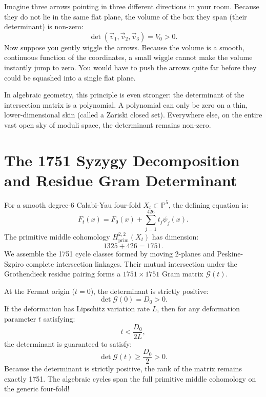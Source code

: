\documentclass[11pt,a4paper]{article}
\theoremstyle{definition}
\begin{document}
Imagine three arrows pointing in three different directions in your room. Because they do not lie in the same flat plane, the volume of the box they span (their determinant) is non-zero:
\begin{equation}
\det(\vec{v}_1, \vec{v}_2, \vec{v}_3) = V_0 > 0.
\end{equation}
Now suppose you gently wiggle the arrows. Because the volume is a smooth, continuous function of the coordinates, a small wiggle cannot make the volume instantly jump to zero. You would have to push the arrows quite far before they could be squashed into a single flat plane.

In algebraic geometry, this principle is even stronger: the determinant of the intersection matrix is a polynomial. A polynomial can only be zero on a thin, lower-dimensional skin (called a Zariski closed set). Everywhere else, on the entire vast open sky of moduli space, the determinant remains non-zero.

\section{The 1751 Syzygy Decomposition and Residue Gram Determinant}

For a smooth degree-6 Calabi-Yau four-fold $X_t \subset \mathbb{P}^5$, the defining equation is:
\begin{equation}
F_t(x) = F_0(x) + \sum_{j=1}^{426} t_j \psi_j(x).
\end{equation}
The primitive middle cohomology $H^{2,2}_{\text{prim}}(X_t)$ has dimension:
\begin{equation}
1325 + 426 = 1751.
\end{equation}
We assemble the 1751 cycle classes formed by moving 2-planes and Peskine-Szpiro complete intersection linkages. Their mutual intersection under the Grothendieck residue pairing forms a $1751 \times 1751$ Gram matrix $\mathcal{G}(t)$.

At the Fermat origin ($t = 0$), the determinant is strictly positive:
\begin{equation}
\det \mathcal{G}(0) = D_0 > 0.
\end{equation}
If the deformation has Lipschitz variation rate $L$, then for any deformation parameter $t$ satisfying:
\begin{equation}
t < \frac{D_0}{2 L},
\end{equation}
the determinant is guaranteed to satisfy:
\begin{equation}
\det \mathcal{G}(t) \ge \frac{D_0}{2} > 0.
\end{equation}
Because the determinant is strictly positive, the rank of the matrix remains exactly 1751. The algebraic cycles span the full primitive middle cohomology on the generic four-fold!
\end{document}
